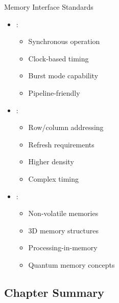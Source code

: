 \begin{frame}{Memory Interface Standards}
\begin{itemize}
\item {}:
\begin{itemize}
\item Synchronous operation
\item Clock-based timing
\item Burst mode capability
\item Pipeline-friendly
\end{itemize}
\vspace{0.3cm}
\item {}:
\begin{itemize}
\item Row/column addressing
\item Refresh requirements
\item Higher density
\item Complex timing
\end{itemize}
\vspace{0.3cm}
\item {}:
\begin{itemize}
\item Non-volatile memories
\item 3D memory structures
\item Processing-in-memory
\item Quantum memory concepts
\end{itemize}
\end{itemize}
\end{frame}

\subsection{Chapter Summary}


